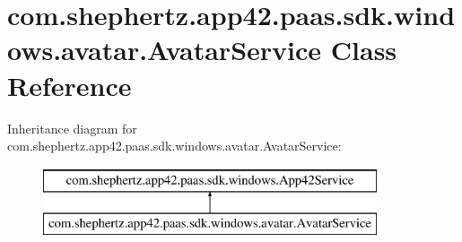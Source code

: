 \hypertarget{classcom_1_1shephertz_1_1app42_1_1paas_1_1sdk_1_1windows_1_1avatar_1_1_avatar_service}{\section{com.\+shephertz.\+app42.\+paas.\+sdk.\+windows.\+avatar.\+Avatar\+Service Class Reference}
\label{classcom_1_1shephertz_1_1app42_1_1paas_1_1sdk_1_1windows_1_1avatar_1_1_avatar_service}
}
Inheritance diagram for com.\+shephertz.\+app42.\+paas.\+sdk.\+windows.\+avatar.\+Avatar\+Service\+:\begin{figure}[H]
\begin{center}
\leavevmode
\includegraphics[height=2.000000cm]{classcom_1_1shephertz_1_1app42_1_1paas_1_1sdk_1_1windows_1_1avatar_1_1_avatar_service}
\end{center}
\end{figure}
